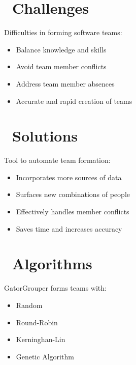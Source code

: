 \documentclass[a0paper,fleqn]{betterposter}
\begin{document}
{  %

  \vspace*{-.25in}
  \section{\faCube~Challenges}
  Difficulties in forming software teams:
  \begin{itemize}
    \item Balance knowledge and skills
    \item Avoid team member conflicts
    \item Address team member absences
    \item Accurate and rapid creation of teams
  \end{itemize}

  \vspace*{-.25in}
  \section{\faTrophy~Solutions}
  Tool to automate team formation:
  \begin{itemize}
    \item Incorporates more sources of data
    \item Surfaces new combinations of people
    \item Effectively handles member conflicts
    \item Saves time and increases accuracy
  \end{itemize}

  \vspace*{-.25in}
  \section{\faCog~Algorithms}
  GatorGrouper forms teams with:
  \begin{itemize}
    \item Random
    \item Round-Robin
    \item Kerninghan-Lin
    \item Genetic Algorithm
  \end{itemize}

}
\end{document}
